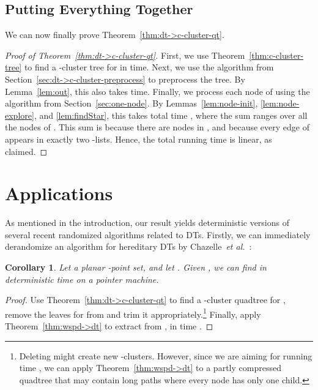 \documentclass[11pt]{paper}
\newcommand {\etal} {\textit {et al.}}
\newtheorem {cor}[theorem] {Corollary}
\begin{document}
\subsection {Putting Everything Together}
We can now finally prove Theorem~\ref{thm:dt->c-cluster-qt}.

\begin{proof}[Proof of Theorem~\ref{thm:dt->c-cluster-qt}]
First, we use Theorem~\ref{thm:c-cluster-tree} to find a -cluster
tree  for  in  time. Next, we use the algorithm from
Section~\ref{sec:dt->c-cluster-preprocess} to preprocess the tree.
By Lemma~\ref{lem:out}, this also takes  time. Finally,
we process each node of  using the algorithm from 
Section~\ref{sec:one-node}. 
By Lemmas~\ref{lem:node-init}, \ref{lem:node-explore},
and \ref{lem:findStar}, this takes total time
, where the sum ranges over
all the nodes of . This sum is  because there are
 nodes in , and because every edge of 
appears in exactly two -lists. Hence, the total running
time is linear, as claimed.
\end{proof}





















\section {Applications}
\label {sec:applications}

  As mentioned in the introduction, 
  our result yields
  deterministic versions of several recent randomized algorithms
  related to DTs. 
  Firstly, we can immediately derandomize
  an algorithm for hereditary DTs by
  Chazelle~\etal~\cite{ChazelleDeHuMoSaTe02,ChazelleMu11}:


  \begin {cor}\label{cor:split}
     Let  a planar -point set, and let .
     Given , we can find 
     in deterministic time  on a pointer machine.
  \end {cor}

  \begin{proof}
     Use Theorem~\ref{thm:dt->c-cluster-qt}  to find a -cluster
     quadtree  for ,
     remove the leaves for  from  and trim it
     appropriately.\footnote{Deleting  might
     create new -clusters. However, since we are aiming
     for running time , we can  apply Theorem~\ref{thm:wspd->dt}
     to a partly compressed quadtree that may contain
     long paths where every node has only one child.}
     Finally, apply Theorem~\ref{thm:wspd->dt} to extract  from ,
     in time .
  \end{proof}
\end{document}
